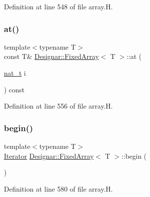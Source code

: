 Definition at line 548 of file array.\+H.

\mbox{\label{class_designar_1_1_fixed_array_a3a1dec650628273bf08b6656db0a9088}} 
\subsubsection{\texorpdfstring{at()}{at()}\hspace{0.1cm}{\footnotesize\ttfamily [2/2]}}
{\footnotesize\ttfamily template$<$typename T$>$ \\
const T\& \hyperlink{class_designar_1_1_fixed_array}{Designar\+::\+Fixed\+Array}$<$ T $>$\+::at (\begin{DoxyParamCaption}\item[{\hyperlink{namespace_designar_aa72662848b9f4815e7bf31a7cf3e33d1}{nat\+\_\+t}}]{i }\end{DoxyParamCaption}) const\hspace{0.3cm}{\ttfamily [inline]}}



Definition at line 556 of file array.\+H.

\mbox{\label{class_designar_1_1_fixed_array_a40c099038e41c839acca94bf352753fc}} 
\subsubsection{\texorpdfstring{begin()}{begin()}\hspace{0.1cm}{\footnotesize\ttfamily [1/2]}}
{\footnotesize\ttfamily template$<$typename T$>$ \\
\hyperlink{class_designar_1_1_fixed_array_1_1_iterator}{Iterator} \hyperlink{class_designar_1_1_fixed_array}{Designar\+::\+Fixed\+Array}$<$ T $>$\+::begin (\begin{DoxyParamCaption}{ }\end{DoxyParamCaption})\hspace{0.3cm}{\ttfamily [inline]}}



Definition at line 580 of file array.\+H.

\mbox{\label{class_designar_1_1_fixed_array_afeedbafa8456c56f80716466191810d6}} 
